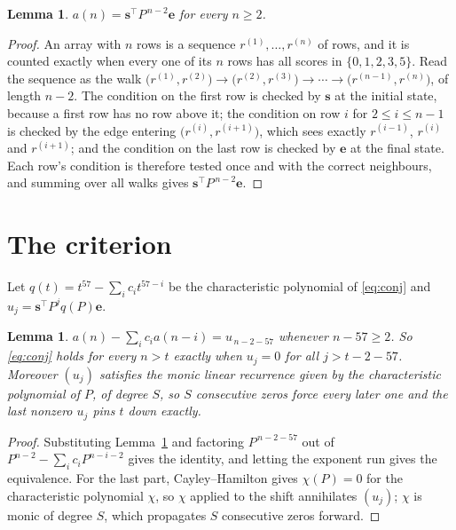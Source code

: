\documentclass[11pt,a4paper]{article}
\theoremstyle{plain}
\newtheorem{lemma}[theorem]{Lemma}
\theoremstyle{definition}
\begin{document}
\begin{lemma}\label{lem:walk}
$a(n)=\mathbf{s}^{\!\top}P^{\,n-2}\mathbf{e}$ for every $n\ge2$.
\end{lemma}

\begin{proof}
An array with $n$ rows is a sequence $r^{(1)},\dots,r^{(n)}$ of rows, and it is counted
exactly when every one of its $n$ rows has all scores in $\{0,1,2,3,5\}$. Read the sequence as the
walk $\bigl(r^{(1)},r^{(2)}\bigr)\to\bigl(r^{(2)},r^{(3)}\bigr)\to\cdots\to
\bigl(r^{(n-1)},r^{(n)}\bigr)$, of length $n-2$. The condition on the first row is
checked by $\mathbf{s}$ at the initial state, because a first row has no row above it; the
condition on row $i$ for $2\le i\le n-1$ is checked by the edge entering
$\bigl(r^{(i)},r^{(i+1)}\bigr)$, which sees exactly $r^{(i-1)}$, $r^{(i)}$ and
$r^{(i+1)}$; and the condition on the last row is checked by $\mathbf{e}$ at the final
state. Each row's condition is therefore tested once and with the correct neighbours, and
summing over all walks gives $\mathbf{s}^{\!\top}P^{\,n-2}\mathbf{e}$.
\end{proof}

\section{The criterion}

Let $q(t)=t^{57}-\sum_i c_i t^{57-i}$ be the characteristic polynomial of
\eqref{eq:conj} and $u_j=\mathbf{s}^{\!\top}P^{j}q(P)\mathbf{e}$.

\begin{lemma}\label{lem:crit}
$a(n)-\sum_i c_i a(n-i)=u_{\,n-2-57}$ whenever $n-57\ge2$. So \eqref{eq:conj}
holds for every $n>t$ exactly when $u_j=0$ for all $j>t-2-57$. Moreover $(u_j)$
satisfies the monic linear recurrence given by the characteristic polynomial of $P$, of
degree $S$, so $S$ consecutive zeros force every later one and the last nonzero $u_j$ pins
$t$ down exactly.
\end{lemma}

\begin{proof}
Substituting Lemma~\ref{lem:walk} and factoring $P^{\,n-2-57}$ out of
$P^{n-2}-\sum_i c_i P^{n-i-2}$ gives the identity, and letting the exponent run gives the
equivalence. For the last part, Cayley--Hamilton gives $\chi(P)=0$ for the characteristic
polynomial $\chi$, so $\chi$ applied to the shift annihilates $(u_j)$; $\chi$ is monic of
degree $S$, which propagates $S$ consecutive zeros forward.
\end{proof}
\end{document}
